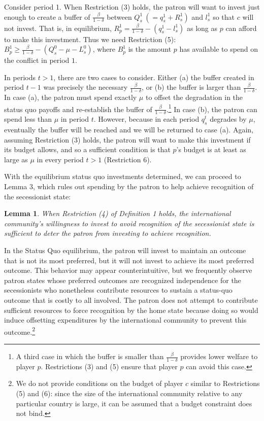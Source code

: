 \documentclass[11pt,letterpaper, notitlepage]{article}
\newtheorem{lemma}{Lemma}
\newcommand{\de}{\delta}
\begin{document}
Consider period 1. When Restriction (3) holds, the patron will want to invest just enough to create a buffer of $\frac{\beta}{1-\de}$ between $Q_s^1 \ (= q_s^1 + R_s^1)$ and $l_s^1$ so that $c$ will not invest. That is, in equilibrium, $R_p^1 = \frac{\beta}{1-\de} -(q_s^1 - l_s^1)$ as long as $p$ can afford to make this investment. Thus we need Restriction (5): $B_p^1 \geq\frac{\beta}{1-\de} - \left(Q_s^0 - \mu - L_s^0 \right)$, where $B_p^1$ is the amount $p$ has available to spend on the conflict in period $1$.

In periods $t > 1$, there are two cases to consider. Either (a) the buffer created in period $t-1$ was precisely the necessary $\frac{\beta}{1-\de}$, or (b) the buffer is larger than $\frac{\beta}{1-\de}$. In case (a), the patron must spend exactly $\mu$ to offset the degradation in the status quo payoffs and re-establish the buffer of $\frac{\beta}{1-\de}$.\footnote{A third case in which the buffer is smaller than $\frac{\beta}{1-\de}$ provides lower welfare to player $p$. Restrictions (3) and (5) ensure that player $p$ can avoid this case.} In case (b), the patron can spend less than $\mu$ in period $t$. However, because in each period $q_s^t$ degrades by $\mu$, eventually the buffer will be reached and we will be returned to case (a). Again, assuming Restriction (3) holds, the patron will want to make this investment if its budget allows, and so a sufficient condition is that $p$'s budget is at least as large as $\mu$ in every period $t > 1$ (Restriction 6). 

With the equilibrium status quo investments determined, we can proceed to Lemma 3, which rules out spending by the patron to help achieve recognition of the secessionist state:

\begin{lemma}
When Restriction (4) of Definition 1 holds, the international community's willingness to invest to avoid recognition of the secessionist state is sufficient to deter the patron from investing to achieve recognition.
\end{lemma}

In the Status Quo equilibrium, the patron will invest to maintain an outcome that is not its most preferred, but it will not invest to achieve its most preferred outcome. This behavior may appear counterintuitive, but we frequently observe patron states whose preferred outcomes are recognized independence for the secessionists who  nonetheless contribute resources to sustain a status-quo outcome that is costly to all involved. The patron does not attempt to contribute sufficient resources to force recognition by the home state because doing so would induce offsetting expenditures by the international community to prevent this outcome.\footnote{We do not provide conditions on the budget of player $c$ similar to Restrictions (5) and (6): since the size of the international community relative to any particular country is large, it can be assumed that a budget constraint does not bind.}
\end{document}
